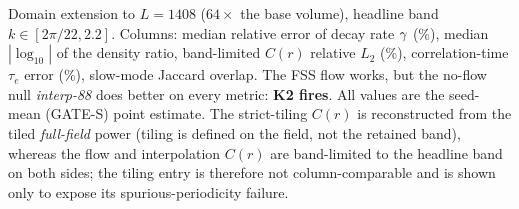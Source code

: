 \begin{table}[t]
\centering
\caption{Domain extension to $L=1408$ ($64\times$ the base volume), headline band
$k\in[2\pi/22,2.2]$. Columns: median relative error of decay rate $\gc$ (\%),
median $|\log_{10}|$ of the density ratio, band-limited $C(r)$ relative $L_2$
(\%), correlation-time $\tau_e$ error (\%), slow-mode Jaccard overlap. The FSS
flow works, but the no-flow null \emph{interp-88} does better on every metric:
\textbf{K2 fires}. All values are the seed-mean (GATE-S) point estimate. The
strict-tiling $C(r)$ is reconstructed from the tiled \emph{full-field} power
(tiling is defined on the field, not the retained band), whereas the flow and
interpolation $C(r)$ are band-limited to the headline band on both sides; the
tiling entry is therefore not column-comparable and is shown only to expose its
spurious-periodicity failure.}
\label{tab:baselines}
\small

\end{table}
